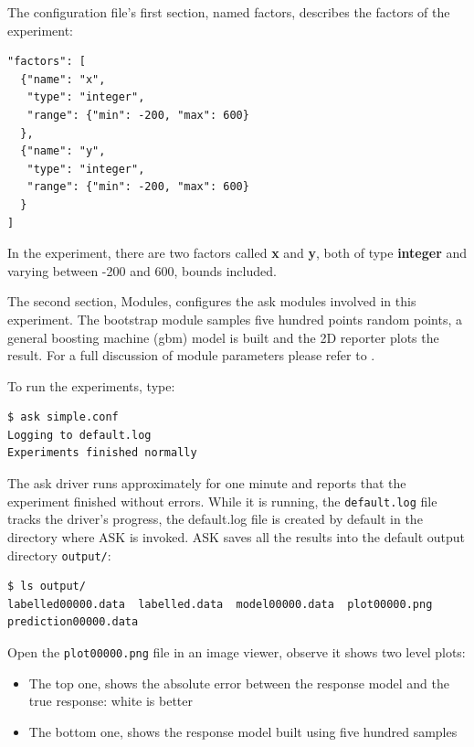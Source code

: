 The configuration file's first section, named factors, describes the factors of the experiment:

\begin{verbatim}
"factors": [
  {"name": "x",
   "type": "integer",
   "range": {"min": -200, "max": 600}
  },
  {"name": "y",
   "type": "integer",
   "range": {"min": -200, "max": 600}
  }
]
\end{verbatim}

In the experiment, there are two factors called \textbf{x} and \textbf{y}, both of type \textbf{integer} and varying between -200 and 600, bounds included.

The second section, Modules, configures the ask modules involved in this experiment. The bootstrap module samples five hundred points random points, a general boosting machine (gbm) model is built and the 2D reporter plots the result. For a full discussion of module parameters please refer to . 

To run the experiments, type:

\begin{verbatim}
$ ask simple.conf
Logging to default.log
Experiments finished normally
\end{verbatim}

The ask driver runs approximately for one minute and reports that the experiment finished without errors. While it is running, the \texttt{default.log} file tracks the driver's progress, the default.log file is created by default in the directory where ASK is invoked. ASK saves all the results into the default output directory \texttt{output/}:

\begin{verbatim}
$ ls output/
labelled00000.data  labelled.data  model00000.data  plot00000.png  
prediction00000.data
\end{verbatim}

Open the \texttt{plot00000.png} file in an image viewer, observe it shows two level plots:

\begin{itemize}
	\item The top one, shows the absolute error between the response model and the true response: white is better
\end{itemize}

\begin{itemize}
	\item The bottom one, shows the response model built using five hundred samples
\end{itemize}

